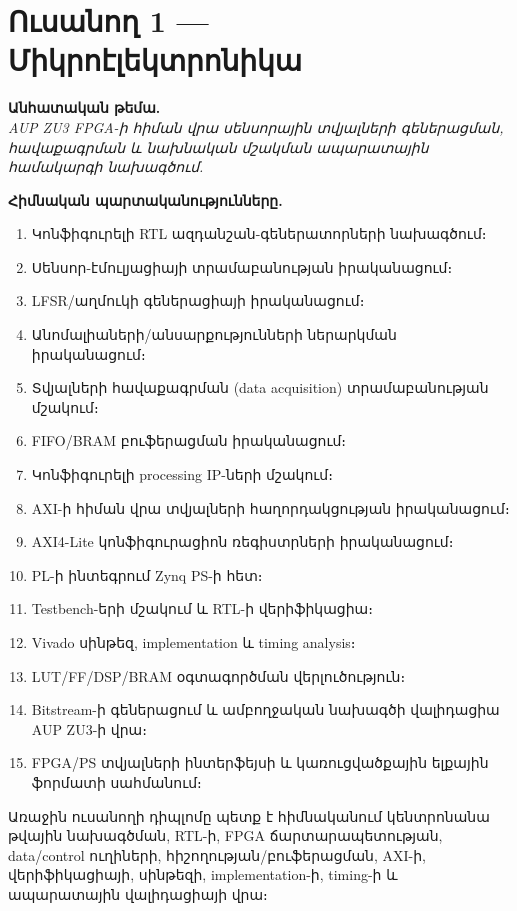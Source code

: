 \chapter{Ուսանող 1 — Միկրոէլեկտրոնիկա}

\textbf{Անհատական թեմա.}\\
\emph{AUP ZU3 FPGA-ի հիման վրա սենսորային տվյալների գեներացման, հավաքագրման և
նախնական մշակման ապարատային համակարգի նախագծում.}

\textbf{Հիմնական պարտականությունները.}
\begin{enumerate}[leftmargin=1.6em]
  \item Կոնֆիգուրելի RTL ազդանշան-գեներատորների նախագծում։
  \item Սենսոր-էմուլյացիայի տրամաբանության իրականացում։
  \item LFSR/աղմուկի գեներացիայի իրականացում։
  \item Անոմալիաների/անսարքությունների ներարկման իրականացում։
  \item Տվյալների հավաքագրման (data acquisition) տրամաբանության մշակում։
  \item FIFO/BRAM բուֆերացման իրականացում։
  \item Կոնֆիգուրելի processing IP-ների մշակում։
  \item AXI-ի հիման վրա տվյալների հաղորդակցության իրականացում։
  \item AXI4-Lite կոնֆիգուրացիոն ռեգիստրների իրականացում։
  \item PL-ի ինտեգրում Zynq PS-ի հետ։
  \item Testbench-երի մշակում և RTL-ի վերիֆիկացիա։
  \item Vivado սինթեզ, implementation և timing analysis։
  \item LUT/FF/DSP/BRAM օգտագործման վերլուծություն։
  \item Bitstream-ի գեներացում և ամբողջական նախագծի վալիդացիա AUP ZU3-ի վրա։
  \item FPGA/PS տվյալների ինտերֆեյսի և կառուցվածքային ելքային ֆորմատի սահմանում։
\end{enumerate}

Առաջին ուսանողի դիպլոմը պետք է հիմնականում կենտրոնանա թվային նախագծման, RTL-ի, FPGA
ճարտարապետության, data/control ուղիների, հիշողության/բուֆերացման, AXI-ի,
վերիֆիկացիայի, սինթեզի, implementation-ի, timing-ի և ապարատային վալիդացիայի վրա։
